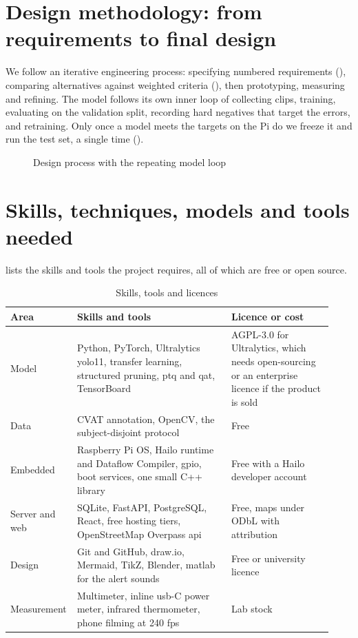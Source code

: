 
\section{Design methodology: from requirements to final design}

We follow an iterative engineering process: specifying numbered requirements (), comparing alternatives against weighted criteria (), then prototyping, measuring and refining. The model follows its own inner loop of collecting clips, training, evaluating on the validation split, recording hard negatives that target the errors, and retraining. Only once a model meets the targets on the Pi do we freeze it and run the test set, a single time ().

\begin{figure}[htbp]
  \centering
  \resizebox{\linewidth}{!}{}
  \caption{Design process with the repeating model loop}
  \label{fig:ch5-01}
\end{figure}

\section{Skills, techniques, models and tools needed}

 lists the skills and tools the project requires, all of which are free or open source.

\begin{table}[htbp]
\centering
\caption{Skills, tools and licences}
\label{tab:ch5-tools}
\footnotesize
\setlength{\tabcolsep}{3pt}
\renewcommand{\arraystretch}{1.15}
\begin{tabular}{|p{0.150\linewidth}|p{0.470\linewidth}|p{0.310\linewidth}|}
\hline
\textbf{Area} & \textbf{Skills and tools} & \textbf{Licence or cost} \\
\hline
Model & Python, PyTorch, Ultralytics \gls{yolo}11, transfer learning, structured pruning, \gls{ptq} and \gls{qat}, TensorBoard & AGPL-3.0 for Ultralytics, which needs open-sourcing or an enterprise licence if the product is sold \\
\hline
Data & CVAT annotation, OpenCV, the subject-disjoint protocol & Free \\
\hline
Embedded & Raspberry Pi OS, Hailo runtime and Dataflow Compiler, \gls{gpio}, boot services, one small C++ library & Free with a Hailo developer account \\
\hline
Server and web & SQLite, FastAPI, PostgreSQL, React, free hosting tiers, OpenStreetMap Overpass \gls{api} \cite{r68} & Free, maps under ODbL with attribution \\
\hline
Design & Git and GitHub, draw.io, Mermaid, TikZ, Blender, \gls{matlab} for the alert sounds & Free or university licence \\
\hline
Measurement & Multimeter, inline \gls{usb}-C power meter, infrared thermometer, phone filming at 240 \gls{fps} & Lab stock \\
\hline
\end{tabular}
\end{table}


